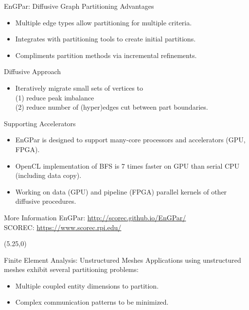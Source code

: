\documentclass{beamer}
\begin{document}
\begin{textblock}{15.6}
\begin{textblock}{5.1}
\begin{block}{\centering EnGPar: Diffusive Graph Partitioning}
      Advantages
      \begin{itemize}
      \item Multiple edge types allow partitioning for multiple criteria.
      \item Integrates with partitioning tools to create initial partitions.
      \item Compliments partition methods via incremental refinements.
      \end{itemize}
      
      Diffusive Approach
      \begin{itemize}
      \item Iteratively migrate small sets of vertices to \\(1) reduce peak imbalance \\(2) reduce number of (hyper)edges cut between part boundaries.
      \end{itemize}
    \end{block}
    \begin{block}{\centering Supporting Accelerators}
      \begin{itemize}
      \item EnGPar is designed to support many-core processors and accelerators (GPU, FPGA).
      \item OpenCL implementation of BFS is 7 times faster on GPU than serial CPU (including data copy).
      \item Working on data (GPU) and pipeline (FPGA) parallel kernels of other diffusive procedures.
      \end{itemize}

    \end{block}
    \begin{block}{\centering More Information}
      EnGPar: \url{http://scorec.github.io/EnGPar/} \\
      SCOREC: \url{https://www.scorec.rpi.edu/}
    \end{block}

  \end{textblock}
  \begin{textblock}{5.1}(5.25,0)
    \begin{block}{\centering Finite Element Analysis: Unstructured Meshes}
      Applications using unstructured meshes exhibit several partitioning problems:
      \begin{itemize}
      \item Multiple coupled entity dimensions to partition.
      \item Complex communication patterns to be minimized.
      \end{itemize}
      

\end{block}
\end{textblock}
\end{textblock}
\end{document}
